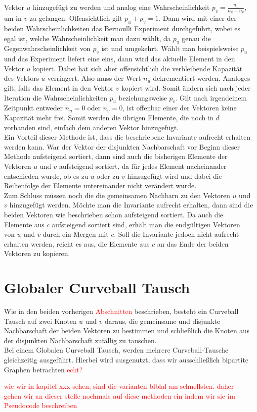 Vektor $u$ hinzugefügt zu werden und analog eine Wahrscheinlichkeit $p_v = \frac{n_v}{n_u+n_v}$, um
in $v$ zu gelangen. Offensichtlich gilt $p_u + p_v = 1$. Dann wird mit einer der beiden
Wahrscheinlichkeiten das Bernoulli Experiment durchgeführt, wobei es egal ist, welche Wahrscheinlichkeit
man dazu wählt, da $p_u$ genau die Gegenwahrscheinlichkeit von $p_v$ ist und umgekehrt. 
Wählt man beispielsweise $p_u$ und das Experiment liefert eine eins, dann wird das aktuelle Element
in den Vektor $u$ kopiert. Dabei
hat sich aber offensichtlich die verbleibende Kapazität des Vektors $u$ verringert. Also muss
der Wert $n_u$ dekrementiert werden. Analoges gilt, falls das Element in den Vektor $v$ kopiert wird.
Somit ändern sich nach jeder Iteration die Wahrscheinlichkeiten $p_u$ beziehungsweise $p_v$.
Gilt nach irgendeinem Zeitpunkt entweder $n_u = 0$ oder $n_v = 0$, ist offenbar einer der Vektoren 
keine Kapazität mehr frei. Somit werden die übrigen Elemente, die noch in $d$ vorhanden sind, 
einfach dem anderen Vektor hinzugefügt.
\\
Ein Vorteil dieser Methode ist, dass die beschriebene Invariante aufrecht erhalten werden kann.
War der Vektor der disjunkten Nachbarschaft vor Beginn dieser Methode aufsteigend sortiert,
dann sind auch die bisherigen Elemente der Vektoren $u$ und $v$ aufsteigend sortiert, da für jedes
Element nacheinander entschieden wurde, ob es zu $u$ oder zu $v$ hinzugefügt wird und dabei die
Reihenfolge der Elemente untereinander nicht verändert wurde.
\\
Zum Schluss müssen noch die die gemeinsamen Nachbarn zu den Vektoren $u$ und $v$ hinzugefügt werden.
Möchte man die Invariante aufrecht erhalten, dann sind die beiden Vektoren wie beschrieben schon
aufsteigend sortiert. Da auch die Elemente aus $c$ aufsteigend sortiert sind, erhält man
die endgültigen Vektoren von $u$ und $v$ durch ein Mergen mit $c$. Soll die Invariante jedoch
nicht aufrecht erhalten werden, reicht es aus, die Elemente aus $c$ an das Ende der beiden Vektoren
zu kopieren.


\section{Globaler Curveball Tausch}
Wie in den beiden vorherigen \textcolor{red}{Abschnitten} beschrieben, besteht ein Curveball Tausch auf zwei Knoten $u$ und $v$ daraus, die gemeinsame und disjunkte Nachbarschaft der beiden Vektoren zu bestimmen
und schließlich die Knoten aus der disjunkten Nachbarschaft zufällig zu tauschen.
\\
Bei einem Globalen Curveball Tausch, werden mehrere Curveball-Tausche gleichzeitig ausgeführt.
Hierbei wird ausgenutzt, dass wir ausschließlich bipartite Graphen betrachten \textcolor{red}{echt?}





\textcolor{red}{wie wir in kapitel xxx sehen, sind die varianten blblal am schnellsten. daher gehen wir 
an dieser stelle nochmals auf diese methoden ein indem wir sie im Pseudocode beschreiben}
